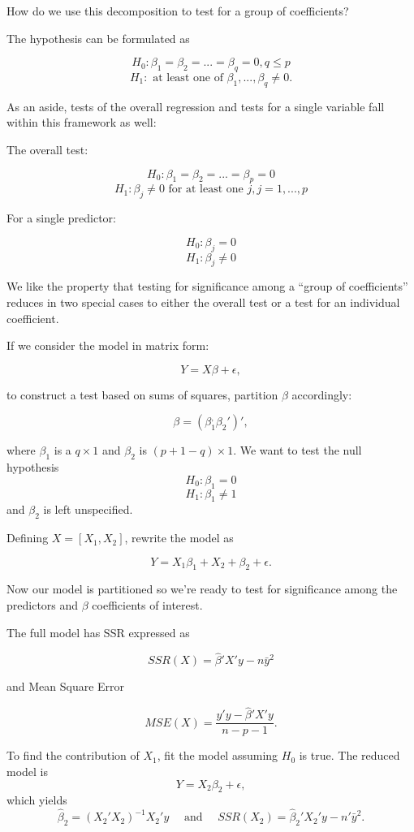 \documentclass[
  letterpaper,
  DIV=11,
  numbers=noendperiod]{scrreport}
\begin{document}
How do we use this decomposition to test for a group of coefficients?

The hypothesis can be formulated as

\[H_0: \beta_1 = \beta_2 = ... = \beta_q = 0, q \leq p\]
\[H_1: \text{ at least one of } \beta_1, ..., \beta_q \neq 0.\]

As an aside, tests of the overall regression and tests for a single
variable fall within this framework as well:

The overall test:

\[H_0: \beta_1 = \beta_2 = ... = \beta_p = 0\]
\[H_1: \beta_j \neq 0 \text{ for at least one } j, j = 1,...,p\]

For a single predictor:

\[H_0: \beta_j = 0\] \[H_1: \beta_j \neq 0\]

We like the property that testing for significance among a ``group of
coefficients'' reduces in two special cases to either the overall test
or a test for an individual coefficient.

If we consider the model in matrix form:

\[Y = X\beta + \epsilon,\]

to construct a test based on sums of squares, partition \(\beta\)
accordingly:

\[\beta = (\beta_1^, \beta_2')',\]

where \(\beta_1\) is a \(q \times 1\) and \(\beta_2\) is
\((p+1-q) \times 1\). We want to test the null hypothesis
\[H_0: \beta_1 = 0\] \[H_1: \beta_1 \neq 1\] and \(\beta_2\) is left
unspecified.

Defining \(X = \left[ X_1, X_2 \right]\), rewrite the model as

\[Y = X_1 \beta_1 + X_2 + \beta_2 + \epsilon.\]

Now our model is partitioned so we're ready to test for significance
among the predictors and \(\beta\) coefficients of interest.

The full model has SSR expressed as

\[SSR(X) = \hat \beta' X' y - n \bar y^2\]

and Mean Square Error

\[MSE(X) = \frac{y'y - \hat \beta' X' y}{n-p-1}.\]

To find the contribution of \(X_1\), fit the model assuming \(H_0\) is
true. The {reduced model} is \[Y = X_2 \beta_2 + \epsilon,\] which
yields
\[\hat \beta_2 = (X_2'X_2)^{-1}X_2'y \quad \text{ and } \quad SSR(X_2) = \hat \beta_2' X_2' y - n' \bar y^2.\]
\end{document}
